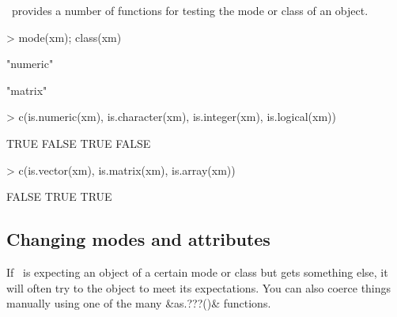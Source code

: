 \R\ provides a number of functions for testing the mode or class of an object.

\begin{Schunk}
\begin{Sinput}
> mode(xm); class(xm)
\end{Sinput}
\begin{Soutput}
[1] "numeric"
\end{Soutput}
\begin{Soutput}
[1] "matrix"
\end{Soutput}
\begin{Sinput}
> c(is.numeric(xm), is.character(xm), is.integer(xm), is.logical(xm))
\end{Sinput}
\begin{Soutput}
[1]  TRUE FALSE  TRUE FALSE
\end{Soutput}
\begin{Sinput}
> c(is.vector(xm), is.matrix(xm), is.array(xm))
\end{Sinput}
\begin{Soutput}
[1] FALSE  TRUE  TRUE
\end{Soutput}
\end{Schunk}


\subsection{Changing modes and attributes}
%
%
%
%

If \R\ is expecting an object of a certain mode or class but gets 
something else, it will often try to  the object to meet 
its expectations.  You
can also coerce things manually using one of the many &as.???()& functions.


